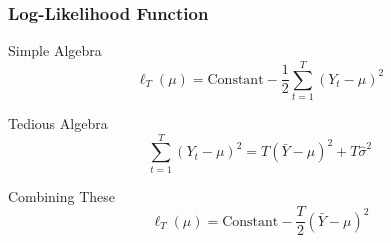 \begin{frame}
  \frametitle{Log-Likelihood Function}

  \begin{block}{Simple Algebra}
    \vspace{-1.5em}
\[ 
    \ell_T(\mu)=  \mbox{Constant} - \frac{1}{2} \sum_{t=1}^{T} (Y_t - \mu)^2
\]
\end{block}

\begin{block}{Tedious Algebra}
    \vspace{-1.5em}
\[
\sum_{t=1}^T (Y_t -\mu)^2 = T(\bar{Y} - \mu)^2 + T \widehat{\sigma}^2
\]
\end{block}

\begin{alertblock}{Combining These}
    \vspace{-1.5em}
    \[
      \ell_T(\mu) = \mbox{Constant} - \frac{T}{2}\left( \bar{Y} - \mu \right)^2
    \]

\end{alertblock}

\end{frame}
%
%
%
%
